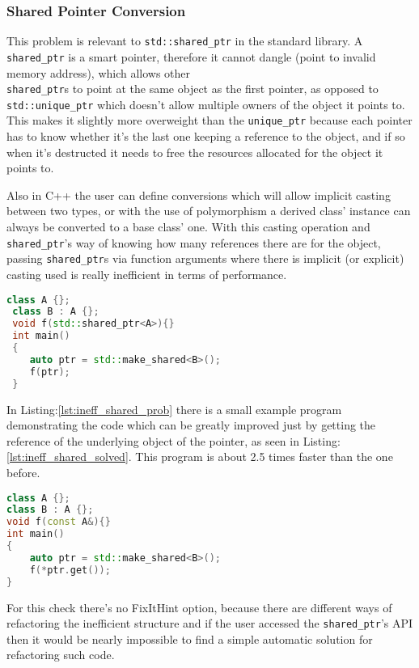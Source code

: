  \subsubsection{Shared Pointer Conversion}
 \par This problem is relevant to \verb|std::shared_ptr| in the standard library. A \verb|shared_ptr| is a smart pointer, therefore it cannot dangle (point to invalid memory address), which allows other \\\verb|shared_ptr|s to point at the same object as the first pointer, as opposed to \verb|std::unique_ptr| which doesn't allow multiple owners of the object it points to. This makes it slightly more overweight than the \verb|unique_ptr| because each pointer has to know whether it's the last one keeping a reference to the object, and if so when it's destructed it needs to free the resources allocated for the object it points to. \medskip
 \par Also in C++ the user can define conversions which will allow implicit casting between two types, or with the use of polymorphism a derived class' instance can always be converted to a base class' one. With this casting operation and \verb|shared_ptr|'s way of knowing how many references there are for the object, passing \verb|shared_ptr|s via function arguments where there is implicit (or explicit) casting used is really inefficient in terms of performance. \pagebreak
 \begin{lstlisting}[language=c++, frame=single ,caption={Inefficient implicit cast}, label={lst:ineff_shared_prob}]
 class A {};
 class B : A {};
 void f(std::shared_ptr<A>){}
 int main()
 {
 	auto ptr = std::make_shared<B>();
 	f(ptr);
 } 
\end{lstlisting}
\par In Listing:\ref{lst:ineff_shared_prob} there is a small example program demonstrating the code which can be greatly improved just by getting the reference of the underlying object of the pointer, as seen in Listing:\ref{lst:ineff_shared_solved}. This program is about 2.5 times faster than the one before. 
\begin{lstlisting}[language=c++, frame=single ,caption={A much faster version}, label={lst:ineff_shared_solved}]
class A {};
class B : A {};
void f(const A&){}
int main()
{
	auto ptr = std::make_shared<B>();
	f(*ptr.get());
}
\end{lstlisting}
\par For this check there's no FixItHint option, because there are different ways of refactoring the inefficient structure and if the user accessed the \verb|shared_ptr|'s API then it would be nearly impossible to find a simple automatic solution for refactoring such code. 
